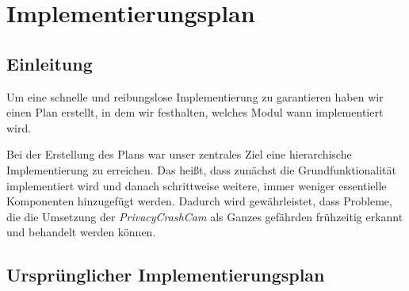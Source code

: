 \chapter{Implementierungsplan} \label{chap:Implementierungsplan}

\section{Einleitung}
Um eine schnelle und reibungslose Implementierung zu garantieren haben wir einen Plan erstellt, in dem wir festhalten, welches Modul wann implementiert wird. \par
Bei der Erstellung des Plans war unser zentrales Ziel eine hierarchische Implementierung zu erreichen. Das heißt, dass zunächst die Grundfunktionalität implementiert wird und danach schrittweise weitere, immer weniger essentielle Komponenten hinzugefügt werden. Dadurch wird gewährleistet, dass Probleme, die die Umsetzung der \textit{PrivacyCrashCam} als Ganzes gefährden frühzeitig erkannt und behandelt werden können.\par

\newpage

\section{Ursprünglicher Implementierungsplan}

